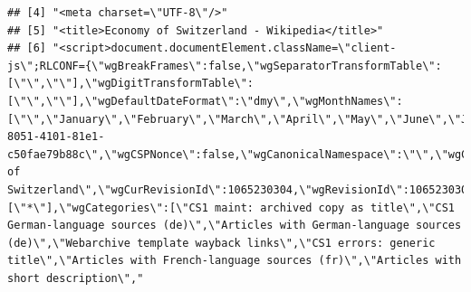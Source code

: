 \documentclass[
  12pt,
]{style/krantz}
\begin{document}
\begin{verbatim}
## [4] "<meta charset=\"UTF-8\"/>"                                                                                                                                                                                                                                                                                                                                                                                                                                                                                                                                                                                                                                                                                                                                                                                                                                                                                                                                                                                                                                                                                                           
## [5] "<title>Economy of Switzerland - Wikipedia</title>"                                                                                                                                                                                                                                                                                                                                                                                                                                                                                                                                                                                                                                                                                                                                                                                                                                                                                                                                                                                                                                                                                   
## [6] "<script>document.documentElement.className=\"client-js\";RLCONF={\"wgBreakFrames\":false,\"wgSeparatorTransformTable\":[\"\",\"\"],\"wgDigitTransformTable\":[\"\",\"\"],\"wgDefaultDateFormat\":\"dmy\",\"wgMonthNames\":[\"\",\"January\",\"February\",\"March\",\"April\",\"May\",\"June\",\"July\",\"August\",\"September\",\"October\",\"November\",\"December\"],\"wgRequestId\":\"f7d5f289-8051-4101-81e1-c50fae79b88c\",\"wgCSPNonce\":false,\"wgCanonicalNamespace\":\"\",\"wgCanonicalSpecialPageName\":false,\"wgNamespaceNumber\":0,\"wgPageName\":\"Economy_of_Switzerland\",\"wgTitle\":\"Economy of Switzerland\",\"wgCurRevisionId\":1065230304,\"wgRevisionId\":1065230304,\"wgArticleId\":27465,\"wgIsArticle\":true,\"wgIsRedirect\":false,\"wgAction\":\"view\",\"wgUserName\":null,\"wgUserGroups\":[\"*\"],\"wgCategories\":[\"CS1 maint: archived copy as title\",\"CS1 German-language sources (de)\",\"Articles with German-language sources (de)\",\"Webarchive template wayback links\",\"CS1 errors: generic title\",\"Articles with French-language sources (fr)\",\"Articles with short description\","

\end{verbatim}
\end{document}
